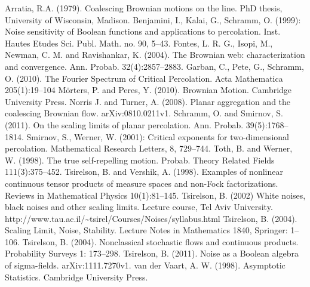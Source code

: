 \begin{thebibliography}{99}
 Arratia, R.A. (1979). Coalescing Brownian motions on
  the line. PhD thesis, University of Wisconsin, Madison.
 Benjamini, I., Kalai, G., Schramm, O. (1999): Noise
  sensitivity of Boolean functions and applications to
  percolation. Inst. Hautes Etudes Sci. Publ. Math. no. 90, 5--43.
 Fontes, L. R. G., Isopi, M., Newman, C. M. and
  Ravishankar, K. (2004). The Brownian web: characterization and
  convergence. Ann. Probab. 32(4):2857--2883.
 Garban, C., Pete, G., Schramm,
  O. (2010). The Fourier Spectrum of Critical Percolation.  Acta Mathematica 205(1):19--104
 M\"orters, P. and Peres, Y. (2010). Brownian
  Motion.  Cambridge University Press.
 Norris J. and Turner, A. (2008). Planar
  aggregation and the coalescing Brownian
  flow. arXiv:0810.0211v1.
  Schramm, O. and Smirnov, S. (2011).
  On the scaling limits of planar percolation.
  Ann. Probab. 39(5):1768--1814.
 Smirnov, S., Werner, W. (2001): Critical
  exponents for two-dimensional percolation. Mathematical Research
  Letters, 8, 729--744.
 Toth, B. and Werner, W. (1998). The true
  self-repelling motion. Probab. Theory Related Fields
  111(3):375--452.
  Tsirelson, B. and Vershik, A. (1998). Examples of nonlinear continuous
  tensor products of measure spaces and non-Fock factorizations. Reviews
  in Mathematical Physics 10(1):81--145.
  Tsirelson, B. (2002)
  White noises, black noises and other scaling limits.
  Lecture course, Tel Aviv University.
  http://www.tau.ac.il/\textasciitilde{}tsirel/Courses/Noises/syllabus.html
  Tsirelson, B. (2004).
  Scaling Limit, Noise, Stability.
  Lecture Notes in Mathematics 1840, Springer: 1--106.
 Tsirelson, B. (2004).
  Nonclassical stochastic flows and continuous products.
  Probability Surveys 1: 173--298.
  Tsirelson, B. (2011).
  Noise as a Boolean algebra of sigma-fields.
  arXiv:1111.7270v1.
 van der Vaart, A. W. (1998). Asymptotic Statistics.
  Cambridge University Press.
\end{thebibliography}
